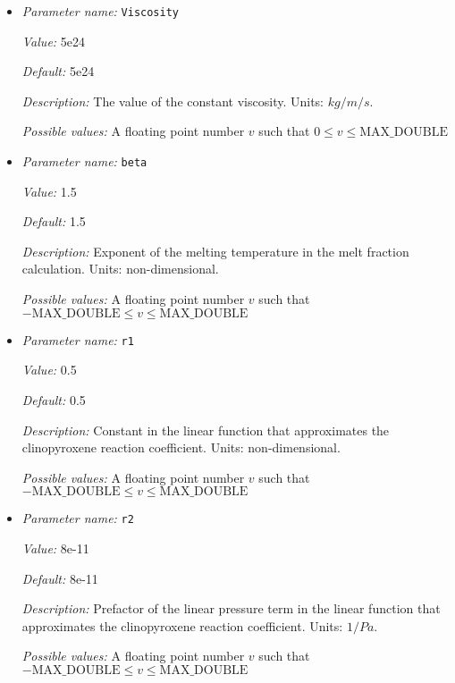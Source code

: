 \begin{itemize}
{\it Default:} 0.0


{\it Description:} The temperature dependence of viscosity. Dimensionless exponent.


{\it Possible values:} A floating point number $v$ such that $0 \leq v \leq \text{MAX\_DOUBLE}$
\item {\it Parameter name:} {\tt Viscosity}
\label{parameters:Material model/Latent heat melt/Viscosity}


{\it Value:} 5e24


{\it Default:} 5e24


{\it Description:} The value of the constant viscosity. Units: $kg/m/s$.


{\it Possible values:} A floating point number $v$ such that $0 \leq v \leq \text{MAX\_DOUBLE}$
\item {\it Parameter name:} {\tt beta}
\label{parameters:Material model/Latent heat melt/beta}


{\it Value:} 1.5


{\it Default:} 1.5


{\it Description:} Exponent of the melting temperature in the melt fraction calculation. Units: non-dimensional.


{\it Possible values:} A floating point number $v$ such that $-\text{MAX\_DOUBLE} \leq v \leq \text{MAX\_DOUBLE}$
\item {\it Parameter name:} {\tt r1}
\label{parameters:Material model/Latent heat melt/r1}


{\it Value:} 0.5


{\it Default:} 0.5


{\it Description:} Constant in the linear function that approximates the clinopyroxene reaction coefficient. Units: non-dimensional.


{\it Possible values:} A floating point number $v$ such that $-\text{MAX\_DOUBLE} \leq v \leq \text{MAX\_DOUBLE}$
\item {\it Parameter name:} {\tt r2}
\label{parameters:Material model/Latent heat melt/r2}


{\it Value:} 8e-11


{\it Default:} 8e-11


{\it Description:} Prefactor of the linear pressure term in the linear function that approximates the clinopyroxene reaction coefficient. Units: $1/Pa$.


{\it Possible values:} A floating point number $v$ such that $-\text{MAX\_DOUBLE} \leq v \leq \text{MAX\_DOUBLE}$
\end{itemize}

